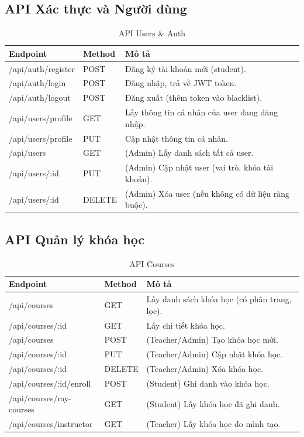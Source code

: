 \subsection{API Xác thực và Người dùng}
\begin{table}[H]
\centering
\caption{API Users \& Auth}
\begin{tabular}{|p{3cm}|p{2.5cm}|p{7cm}|}
\hline
\textbf{Endpoint} & \textbf{Method} & \textbf{Mô tả} \\ \hline
/api/auth/register & POST & Đăng ký tài khoản mới (student). \\ \hline
/api/auth/login & POST & Đăng nhập, trả về JWT token. \\ \hline
/api/auth/logout & POST & Đăng xuất (thêm token vào blacklist). \\ \hline
/api/users/profile & GET & Lấy thông tin cá nhân của user đang đăng nhập. \\ \hline
/api/users/profile & PUT & Cập nhật thông tin cá nhân. \\ \hline
/api/users & GET & (Admin) Lấy danh sách tất cả user. \\ \hline
/api/users/:id & PUT & (Admin) Cập nhật user (vai trò, khóa tài khoản). \\ \hline
/api/users/:id & DELETE & (Admin) Xóa user (nếu không có dữ liệu ràng buộc). \\ \hline
\end{tabular}
\end{table}

\subsection{API Quản lý khóa học}
\begin{table}[H]
\centering
\caption{API Courses}
\begin{tabular}{|p{3cm}|p{2.5cm}|p{7cm}|}
\hline
\textbf{Endpoint} & \textbf{Method} & \textbf{Mô tả} \\ \hline
/api/courses & GET & Lấy danh sách khóa học (có phân trang, lọc). \\ \hline
/api/courses/:id & GET & Lấy chi tiết khóa học. \\ \hline
/api/courses & POST & (Teacher/Admin) Tạo khóa học mới. \\ \hline
/api/courses/:id & PUT & (Teacher/Admin) Cập nhật khóa học. \\ \hline
/api/courses/:id & DELETE & (Teacher/Admin) Xóa khóa học. \\ \hline
/api/courses/:id/enroll & POST & (Student) Ghi danh vào khóa học. \\ \hline
/api/courses/my-courses & GET & (Student) Lấy khóa học đã ghi danh. \\ \hline
/api/courses/instructor & GET & (Teacher) Lấy khóa học do mình tạo. \\ \hline
\end{tabular}
\end{table}

